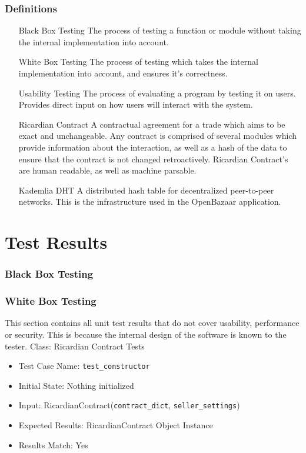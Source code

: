 \documentclass{article}
\begin{document}
\section{Definitions}
\begin{itemize}
\item[Black Box Testing]
The process of testing a function or module without taking the internal implementation into account.

\item[White Box Testing]
The process of testing which takes the internal implementation into account, and ensures it's correctness.

\item[Usability Testing]
The process of evaluating a program by testing it on users. Provides direct input on how users will interact with the system.

\item[Ricardian Contract]
A contractual agreement for a trade which aims to be exact and unchangeable. Any contract is comprised of several modules which provide information about the interaction, as well as a hash of the data to ensure that the contract is not changed retroactively. Ricardian Contract's are human readable, as well as machine parsable. 

\item[Kademlia DHT]
A distributed hash table for decentralized peer-to-peer networks. This is the infrastructure used in the OpenBazaar application.
\end{itemize}

\part*{Test Results}

\section{Black Box Testing}

\section{White Box Testing}
This section contains all unit test results that do not cover usability, performance or security. This is because the internal design of the software is known to the tester.\newline
\newline
Class: Ricardian Contract Tests\newline
\begin{itemize}
\item Test Case Name: \texttt{test\_constructor}
\item Initial State: Nothing initialized
\item Input: RicardianContract(\texttt{contract\_dict}, \texttt{seller\_settings})
\item Expected Results: RicardianContract Object Instance
\item Results Match: Yes\newline
\end{itemize}
\end{document}
